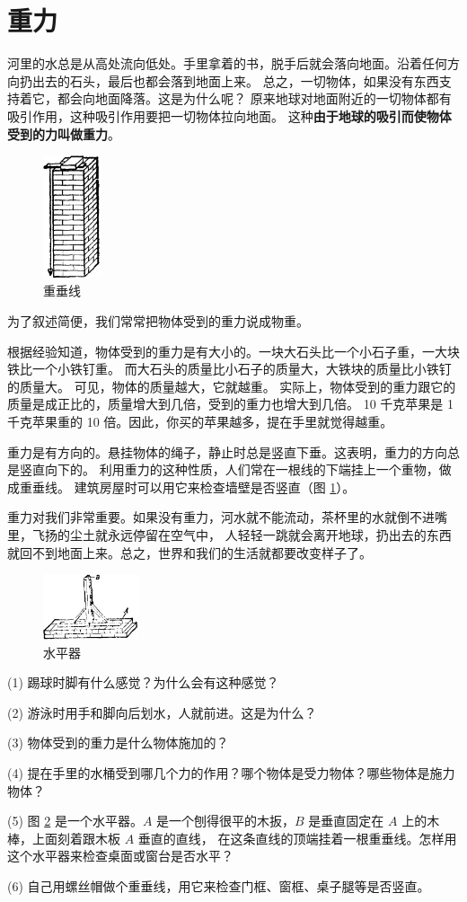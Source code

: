 \section{重力}\label{sec:2-2}

河里的水总是从高处流向低处。手里拿着的书，脱手后就会落向地面。沿着任何方向扔出去的石头，最后也都会落到地面上来。
总之，一切物体，如果没有东西支持着它，都会向地面降落。这是为什么呢？
原来地球对地面附近的一切物体都有吸引作用，这种吸引作用要把一切物体拉向地面。
这种\textbf{由于地球的吸引而使物体受到的力叫做重力}。

\begin{figure}
    \centering
    \includegraphics[width=0.15\textwidth]{../pic/czwl1-ch2-4}
    \caption{重垂线}\label{fig:2-4}
\end{figure}

为了叙述简便，我们常常把物体受到的重力说成物重。

根据经验知道，物体受到的重力是有大小的。一块大石头比一个小石子重，一大块铁比一个小铁钉重。
而大石头的质量比小石子的质量大，大铁块的质量比小铁钉的质量大。
可见，物体的质量越大，它就越重。
实际上，物体受到的重力跟它的质量是成正比的，质量增大到几倍，受到的重力也增大到几倍。
10 千克苹果是 1 千克苹果重的 10 倍。因此，你买的苹果越多，提在手里就觉得越重。

重力是有方向的。悬挂物体的绳子，静止时总是竖直下垂。这表明，重力的方向总是竖直向下的。
利用重力的这种性质，人们常在一根线的下端挂上一个重物，做成重垂线。
建筑房屋时可以用它来检查墙壁是否竖直（图 \ref{fig:2-4}）。

重力对我们非常重要。如果没有重力，河水就不能流动，茶杯里的水就倒不进嘴里，飞扬的尘土就永远停留在空气中，
人轻轻一跳就会离开地球，扔出去的东西就回不到地面上来。总之，世界和我们的生活就都要改变样子了。

\lianxi

\begin{figure}
    \centering
    \includegraphics[width=0.25\textwidth]{../pic/czwl1-ch2-5}
    \caption{水平器}\label{fig:2-5}
\end{figure}

(1) 踢球时脚有什么感觉？为什么会有这种感觉？

(2) 游泳时用手和脚向后划水，人就前进。这是为什么？

(3) 物体受到的重力是什么物体施加的？

(4) 提在手里的水桶受到哪几个力的作用？哪个物体是受力物体？哪些物体是施力物体？

(5) 图 \ref{fig:2-5} 是一个水平器。$A$ 是一个刨得很平的木扳，$B$ 是垂直固定在 $A$ 上的木棒，上面刻着跟木板 $A$ 垂直的直线，
在这条直线的顶端挂着一根重垂线。怎样用这个水平器来检查桌面或窗台是否水平？

(6) 自己用螺丝帽做个重垂线，用它来检查门框、窗框、桌子腿等是否竖直。

